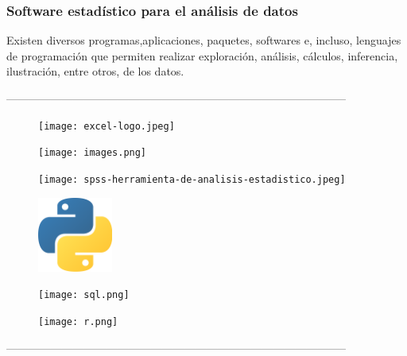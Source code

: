 \documentclass{libs/XJTLU_format}
\begin{document}
\begin{frame}[fragile] 
    \frametitle{Software estadístico para el análisis de datos} 
Existen diversos programas,aplicaciones, paquetes, softwares e, incluso, lenguajes de programación que permiten realizar exploración, análisis, cálculos, inferencia, ilustración, entre otros, de los datos.\newline   

--------------------------------------------------------------------------------------------\newline  


\begin{multicols}{3}
    \begin{figure}[H]
        \raggedright
            \texttt{[image: excel-logo.jpeg]}
    \end{figure}
    \begin{figure}[H]
            \texttt{[image: images.png]}
    \end{figure}
        \begin{figure}[H]
            \texttt{[image: spss-herramienta-de-analisis-estadistico.jpeg]}\newline
    \end{figure} 
        \begin{figure}[H]
        \raggedright
            \includegraphics [width =0.22\textwidth]{python.png}
    \end{figure}
    \begin{figure}[H]
            \texttt{[image: sql.png]}
    \end{figure}
        \begin{figure}[H]
            \texttt{[image: r.png]}
    \end{figure}
\end{multicols}
--------------------------------------------------------------------------------------------
\end{frame}

\end{document}
